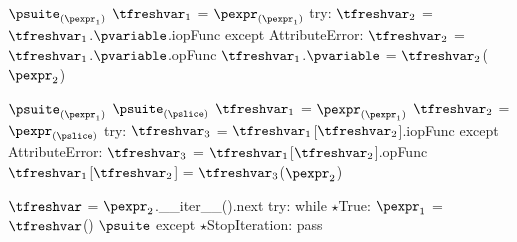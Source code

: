 \documentclass{article}
\begin{document}
\newsavebox{\augmentedAttributeAssignmentBox}
\begin{lrbox}{\augmentedAttributeAssignmentBox}
\begin{python}
$\psuite_{(\pexpr_1)}$
$\tfreshvar_1$ = $\pexpr_{(\pexpr_1)}$
try:
  $\tfreshvar_2$ = $\tfreshvar_1$.$\pvariable$.iopFunc
except AttributeError:
  $\tfreshvar_2$ = $\tfreshvar_1$.$\pvariable$.opFunc
$\tfreshvar_1$.$\pvariable$ = $\tfreshvar_2$($\pexpr_2$)
\end{python}
\end{lrbox}

\begin{mathpar}
\end{mathpar}

\newsavebox{\augmentedSliceAssignmentBox}
\begin{lrbox}{\augmentedSliceAssignmentBox}
\begin{python}
$\psuite_{(\pexpr_1)}$
$\psuite_{(\pslice)}$
$\tfreshvar_1$ = $\pexpr_{(\pexpr_1)}$
$\tfreshvar_2$ = $\pexpr_{(\pslice)}$
try:
  $\tfreshvar_3$ = $\tfreshvar_1$[$\tfreshvar_2$].iopFunc
except AttributeError:
  $\tfreshvar_3$ = $\tfreshvar_1$[$\tfreshvar_2$].opFunc
$\tfreshvar_1$[$\tfreshvar_2$] = $\tfreshvar_3$($\pexpr_2$)
\end{python}
\end{lrbox}

\begin{mathpar}
\end{mathpar}

\newsavebox{\forBox}
\begin{lrbox}{\forBox}
\begin{python}
$\tfreshvar$ = $\pexpr_2$.__iter__().next
try:
  while $\star$True:
    $\pexpr_1$ = $\tfreshvar$()
    $\psuite$
except $\star$StopIteration:
  pass
\end{python}
\end{lrbox}
\end{document}
